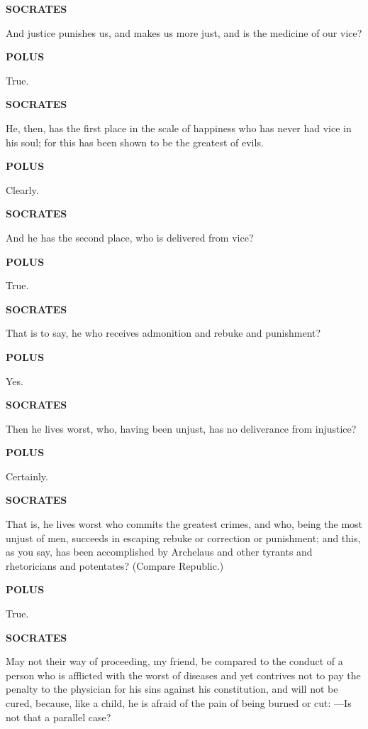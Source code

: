 \documentclass[11pt,letter]{article}
\begin{document}
\par \textbf{SOCRATES}
\par   And justice punishes us, and makes us more just, and is the medicine of our vice?

\par \textbf{POLUS}
\par   True.

\par \textbf{SOCRATES}
\par   He, then, has the first place in the scale of happiness who has never had vice in his soul; for this has been shown to be the greatest of evils.

\par \textbf{POLUS}
\par   Clearly.

\par \textbf{SOCRATES}
\par   And he has the second place, who is delivered from vice?

\par \textbf{POLUS}
\par   True.

\par \textbf{SOCRATES}
\par   That is to say, he who receives admonition and rebuke and punishment?

\par \textbf{POLUS}
\par   Yes.

\par \textbf{SOCRATES}
\par   Then he lives worst, who, having been unjust, has no deliverance from injustice?

\par \textbf{POLUS}
\par   Certainly.

\par \textbf{SOCRATES}
\par   That is, he lives worst who commits the greatest crimes, and who, being the most unjust of men, succeeds in escaping rebuke or correction or punishment; and this, as you say, has been accomplished by Archelaus and other tyrants and rhetoricians and potentates? (Compare Republic.)

\par \textbf{POLUS}
\par   True.

\par \textbf{SOCRATES}
\par   May not their way of proceeding, my friend, be compared to the conduct of a person who is afflicted with the worst of diseases and yet contrives not to pay the penalty to the physician for his sins against his constitution, and will not be cured, because, like a child, he is afraid of the pain of being burned or cut: —Is not that a parallel case?
\end{document}

